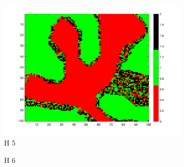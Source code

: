 \documentclass[unicode,11pt,a4paper,oneside,numbers=endperiod,openany]{scrartcl}
\begin{document}
\begin{figure}[H]
\begin{subfigure}[b]{0.3\textwidth}
        \includegraphics[width=\textwidth]{results/iterations_1888_H_5_random_1.png}
        \caption{H 5}
        \label{fig:image5}
      \end{subfigure}
      \begin{subfigure}[b]{0.3\textwidth}
        \caption{H 6}
        \label{fig:image6}
      \end{subfigure}
      
      \begin{subfigure}[b]{0.3\textwidth}
        

\end{subfigure}
\end{figure}
\end{document}
